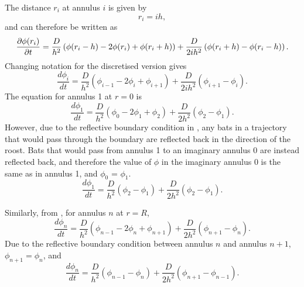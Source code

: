 %
The distance $r_i$ at annulus $i$ is given by
\begin{equation}
r_i = i h ,
\end{equation}
%
and  can therefore be written as
%
\begin{equation}
\frac{\partial \phi(r_i)}{\partial t} = \frac{D}{h^2} \left(\phi(r_i-h)-2\phi(r_i)+\phi(r_i+h)\right) + \frac{D}{2ih^2}\left(\phi(r_i+h)-\phi(r_i-h) \right).
\label{eqn:diffusion_polar_final}
\end{equation}
%
Changing notation for the discretised version gives
%
\begin{equation}
\frac{d\phi_i}{dt} = \frac{D}{h^2}(\phi_{i-1}-2\phi_i +\phi_{i+1}) + \frac{D}{2ih^2} (\phi_{i+1}-\phi_{i}).
        \label{eqn:discrete_diffusion_i}
\end{equation}
%
The equation for annulus 1 at $r=0$ is
%
\begin{equation}
\frac{d\phi_1}{dt} = \frac{D}{h^2}(\phi_{0}-2\phi_1 +\phi_{2}) + \frac{D}{2h^2} (\phi_{2}-\phi_{1}).
\end{equation}
%
However, due to the reflective boundary condition in , any bats in a trajectory that would pass through the boundary are reflected back in the direction of the roost. Bats that would pass from annulus 1 to an imaginary annulus 0 are instead reflected back, and therefore the value of $\phi$ in the imaginary annulus 0 is the same as in annulus 1, and $\phi_0$ = $\phi_1$.
%
\begin{equation}
\frac{d\phi_1}{dt} = \frac{D}{h^2}(\phi_{2}- \phi_1) + \frac{D}{2h^2} (\phi_{2}-\phi_{1}) .
        \label{eqn:annulus_1}
\end{equation}

Similarly, from , for annulus $n$ at $r=R$,
%
\begin{equation}
\frac{d\phi_n}{dt} = \frac{D}{h^2}(\phi_{n-1}-2\phi_n +\phi_{n+1}) + \frac{D}{2h^2} (\phi_{n+1}-\phi_{n}) .
\end{equation}
%
Due to the reflective boundary condition between annulus $n$ and annulus $n+1$, $\phi_{n+1} = \phi_n$, and
\begin{equation}
\frac{d\phi_n}{dt} = \frac{D}{h^2}(\phi_{n-1}-\phi_n) + \frac{D}{2h^2} (\phi_{n+1}-\phi_{n-1}) .
        \label{eqn:annulus_n}
\end{equation}

